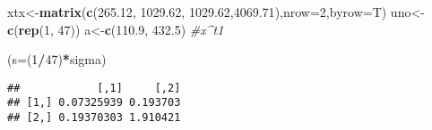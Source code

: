 \documentclass[]{article}
\newenvironment{Shaded}{\begin{snugshade}}{\end{snugshade}}
\newcommand{\CommentTok}[1]{\textcolor[rgb]{0.56,0.35,0.01}{\textit{#1}}}
\newcommand{\DataTypeTok}[1]{\textcolor[rgb]{0.13,0.29,0.53}{#1}}
\newcommand{\DecValTok}[1]{\textcolor[rgb]{0.00,0.00,0.81}{#1}}
\newcommand{\FloatTok}[1]{\textcolor[rgb]{0.00,0.00,0.81}{#1}}
\newcommand{\KeywordTok}[1]{\textcolor[rgb]{0.13,0.29,0.53}{\textbf{#1}}}
\newcommand{\NormalTok}[1]{#1}
\newcommand{\OperatorTok}[1]{\textcolor[rgb]{0.81,0.36,0.00}{\textbf{#1}}}
\newcommand{\StringTok}[1]{\textcolor[rgb]{0.31,0.60,0.02}{#1}}
\begin{document}
\begin{Shaded}
\begin{Highlighting}[]
\NormalTok{xtx<-}\KeywordTok{matrix}\NormalTok{(}\KeywordTok{c}\NormalTok{(}\FloatTok{265.12}\NormalTok{, }\FloatTok{1029.62}\NormalTok{, }\FloatTok{1029.62}\NormalTok{,}\FloatTok{4069.71}\NormalTok{),}\DataTypeTok{nrow=}\DecValTok{2}\NormalTok{,}\DataTypeTok{byrow=}\NormalTok{T)}
\NormalTok{uno<-}\KeywordTok{c}\NormalTok{(}\KeywordTok{rep}\NormalTok{(}\DecValTok{1}\NormalTok{, }\DecValTok{47}\NormalTok{))}
\NormalTok{a<-}\KeywordTok{c}\NormalTok{(}\FloatTok{110.9}\NormalTok{, }\FloatTok{432.5}\NormalTok{) }\CommentTok{#x^t1}
\end{Highlighting}
\end{Shaded}

\begin{Shaded}
\end{Shaded}

\begin{Shaded}
\begin{Highlighting}[]
\NormalTok{(}\DataTypeTok{s=}\NormalTok{(}\DecValTok{1}\OperatorTok{/}\DecValTok{47}\NormalTok{)}\OperatorTok{*}\NormalTok{sigma)}
\end{Highlighting}
\end{Shaded}

\begin{verbatim}
##            [,1]     [,2]
## [1,] 0.07325939 0.193703
## [2,] 0.19370303 1.910421
\end{verbatim}
\end{document}
